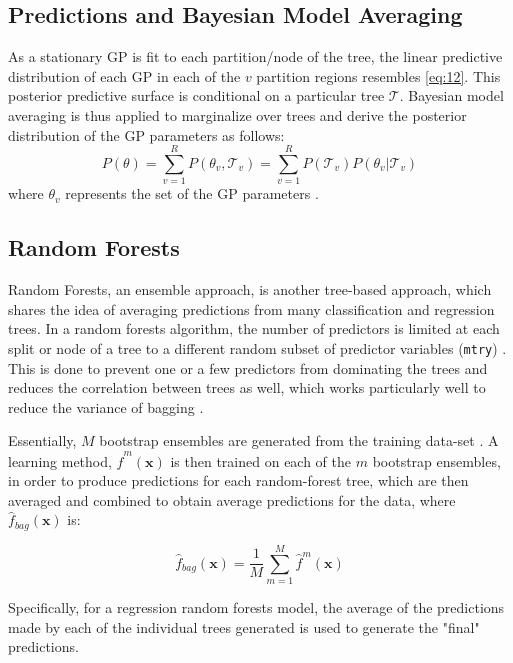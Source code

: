 \documentclass{article}\usepackage[]{graphicx}\usepackage[]{color}
\begin{document}
\subsection*{Predictions and Bayesian Model Averaging}

As a stationary GP is fit to each partition/node of the tree, the linear predictive distribution of each GP in each of the $v$ partition regions resembles \ref{eq:12}. This posterior predictive surface is conditional on a particular tree $\mathcal{T}$. Bayesian model averaging is thus applied to marginalize over trees and derive the posterior distribution of the GP parameters as follows:
\begin{equation}
P(\theta) = \sum_{v=1}^{R} P(\theta_v, \mathcal{T}_v) = \sum_{v=1}^{R} P(\mathcal{T}_v)P(\theta_v|\mathcal{T}_v)
\end{equation}
where $\theta_v$ represents the set of the GP parameters \cite{gramacy_lee_2008}. 

\subsection*{Random Forests}

Random Forests, an ensemble approach, is another tree-based approach, which shares the idea of averaging predictions from many classification and regression trees. In a random forests algorithm, the number of predictors is limited at each split or node of a tree to a different random subset of predictor variables (\texttt{mtry}) \cite{hastie_friedman_tisbshirani_2017}. This is done to prevent one or a few predictors from dominating the trees and reduces the correlation between trees as well, which works particularly well to reduce the variance of bagging \cite{hastie_friedman_tisbshirani_2017}. 

Essentially, $M$ bootstrap ensembles are generated from the training data-set \cite{hastie_friedman_tisbshirani_2017}. A learning method, $\hat{f}^m(\textbf{x})$ is then trained on each of the $m$ bootstrap ensembles, in order to produce  predictions for each random-forest tree, which are then averaged and combined to obtain average predictions for the data, where $\hat{f}_{bag}(\textbf{x})$ is:

\begin{equation}
 \hat{f}_{bag}(\textbf{x}) = \frac{1}{M}\sum\limits^{M}_{m=1}\hat{f}^m(\textbf{x})
\end{equation}

Specifically, for a regression random forests model, the average of the predictions made by each of the individual trees generated is used to generate the "final" predictions.
\end{document}
